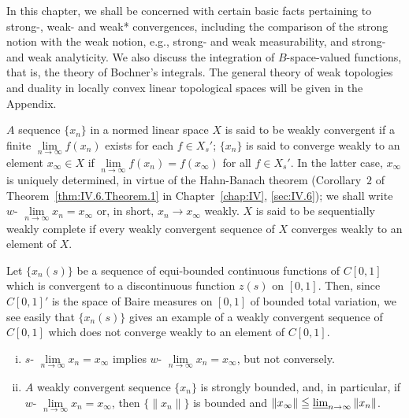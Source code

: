 \label{chap:V}

In this chapter, we shall be concerned with certain basic facts pertaining to strong-, weak- and weak* convergences, including the comparison of the strong notion with the weak notion, e.g., strong- and weak measurability, and strong- and weak analyticity. We also discuss the integration of $B$-space-valued functions, that is, the theory of Bochner's integrals. The general theory of weak topologies and duality in locally convex linear topological spaces will be given in the Appendix. 


\label{sec:V.1}


\begin{definition}\label{def:V.1.Definition.1} $A$ sequence $\{x_{n}\}$ in a normed linear space $X$ is said to be weakly convergent if a finite $\lim\limits_{n\to \infty}f(x_n)$ exists for each $f\in X_s'$; $\{x_{n}\}$ is said to converge weakly to an element $x_{\infty}\in X$ if $\lim\limits_{n\to \infty}f(x_n) = f(x_{\infty})$ for all $f\in X_s'$. In the latter case, $x_{\infty}$ is uniquely determined, in virtue of the Hahn-Banach theorem (Corollary~\hyperref[cor:IV.6.Corollary.2]{$2$} of Theorem~\ref{thm:IV.6.Theorem.1} in Chapter~\ref{chap:IV}, \ref{sec:IV.6}); we shall write $w\text{- }\lim\limits_{n\to \infty}x_n = x_\infty$ or, in short, $x_{n}\rightarrow x_{\infty}$ weakly. $X$ is said to be sequentially weakly complete if every weakly convergent sequence of $X$ converges weakly to an element of $X$. 
\end{definition}

\begin{examplen} Let $\{x_{n}(s)\}$ be a sequence of equi-bounded continuous functions of $C[0,1]$ which is convergent to a discontinuous function $z(s)$ on $[0,1]$. Then, since $C[0,1]'$ is the space of Baire measures on $[0,1]$ of bounded total variation, we see easily that $\{x_{n}(s)\}$ gives an example of a weakly convergent sequence of $C[0,1]$ which does not converge weakly to an element of $C[0,1]$.

\end{examplen}
\begin{theorem}\label{thm:V.1.Theorem.1} \begin{enumerate}[i)]
\item $s\text{- }\lim\limits_{n \to \infty} x_n = x_\infty$ implies $w\text{- }\lim\limits_{n \to \infty} x_n = x_\infty$, but not conversely.
\item $A$ weakly convergent sequence $\{x_n\}$ is strongly bounded, and, in particular, if $w\text{- }\lim\limits_{n \to \infty} x_n = x_\infty$, then $\{\|x_n\|\}$ is bounded and $\|x_\infty\| \leqq \varliminf\limits_{n \to \infty} \|x_n\|$.
\end{enumerate}
\end{theorem}

